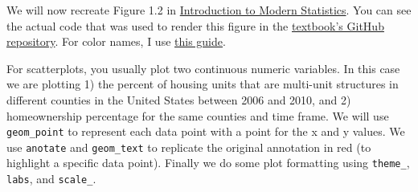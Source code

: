 \documentclass[
]{article}
\begin{document}
We will now recreate Figure 1.2 in
\href{https://openintro-ims.netlify.app/}{Introduction to Modern
Statistics}. You can see the actual code that was used to render this
figure in the
\href{https://github.com/OpenIntroStat/ims/blob/main/01-data-hello.Rmd}{textbook's
GitHub repository}. For color names, I use
\href{http://www.stat.columbia.edu/~tzheng/files/Rcolor.pdf}{this
guide}.

For scatterplots, you usually plot two continuous numeric variables. In
this case we are plotting 1) the percent of housing units that are
multi-unit structures in different counties in the United States between
2006 and 2010, and 2) homeownership percentage for the same counties and
time frame. We will use \texttt{geom\_point} to represent each data
point with a point for the x and y values. We use \texttt{anotate} and
\texttt{geom\_text} to replicate the original annotation in red (to
highlight a specific data point). Finally we do some plot formatting
using \texttt{theme\_}, \texttt{labs}, and \texttt{scale\_}.
\end{document}
